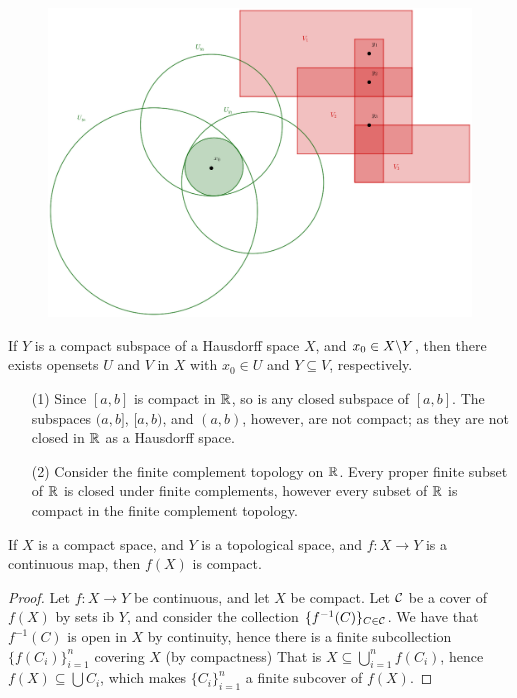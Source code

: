 \begin{figure}[h] 
    \centering
    \includegraphics[scale=0.2]{Figures/Chapter3/compactHausdorff1.eps}
    \caption{}
    \label{fig_3.1}
\end{figure}

\begin{corollary}
    If $Y$ is a compact subspace of a Hausdorff space $X$, and  $ x_0 \in X \backslash Y$, then there
    exists opensets $U$ and  $V$ in  $X$ with  $ x_0 \in U$ and $Y \subseteq V$, respectively.
\end{corollary}

\begin{example}
    \begin{enumerate}
        \item[(1)] Since $[a,b]$ is compact in $\mathbb{R}$, so is any closed subspace of  $[a,b]$. The
            subspaces $(a,b]$, $[a,b)$, and $(a,b)$, however, are not compact; as they are not
            closed in $\mathbb{R}$ as a Hausdorff space.

        \item [(2)] Consider the finite complement topology on $\mathbb{R}$. Every proper finite subset of
            $\mathbb{R}$ is closed under finite complements, however every subset of  $\mathbb{R}$ is compact in the
            finite complement topology.
    \end{enumerate}
\end{example} 

\begin{theorem}\label{3.4.4}
    If $X$ is a compact space, and  $Y$ is a topological space, and  $f:X \rightarrow Y$ is a
    continuous map, then $f(X)$ is compact.
\end{theorem}
\begin{proof}
    Let $f:X \rightarrow Y$ be continuous, and let $X$ be compact. Let  $\mathcal{C}$ be a cover of  $f(X)$
    by sets ib $Y$, and consider the collection  $\{f^{-1}(C)\}_{C \in \mathcal{C}}$. We have that
    $f^{-1}(C)$ is open in $X$ by continuity, hence there is a finite subcollection
    $\{f(C_i)\}_{i=1}^n$ covering $X$  (by compactness) That is $X \subseteq
    \bigcup_{i=1}^n{f(C_i)}$, hence $f(X) \subseteq \bigcup{C_i}$, which makes $\{C_i\}_{i=1}^n$ a
    finite subcover of $f(X)$.
\end{proof}

